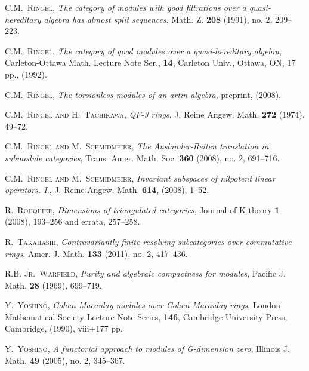 \documentclass[oneside, a4paper,reqno]{amsart}
\numberwithin{equation}{section}
\theoremstyle{definition}
\begin{document}
\begin{thebibliography}{99}
\textsc{C.M.~Ringel}, \textit{The category of modules with good
filtrations over a quasi-hereditary algebra has almost split
sequences},   Math. Z. {\bf 208} (1991),  no. 2, 209--223.

\textsc{C.M.~Ringel}, \textit{The category of good modules over a quasi-hereditary
algebra}, Carleton-Ottawa Math. Lecture Note Ser., {\bf 14},
Carleton Univ., Ottawa, ON, 17 pp., (1992).

\textsc{C.M.~Ringel}, \textit{The torsionless modules of an artin algebra},
preprint, (2008).

\textsc{C.M.~Ringel and H.~Tachikawa}, \textit{QF-3 rings}, J. Reine Angew.
Math.  {\bf 272}  (1974), 49--72.

\textsc{C.M.~Ringel and M.~Schmidmeier}, \textit{The Auslander-Reiten
translation in submodule categories}, Trans. Amer. Math. Soc. {\bf
360} (2008), no. 2, 691--716.

\textsc{C.M.~Ringel and M.~Schmidmeier}, \textit{Invariant subspaces of nilpotent linear
operators. I.}, J. Reine Angew. Math. {\bf 614}, (2008), 1--52.

\textsc{R.~Rouquier}, \textit{Dimensions of triangulated categories},
Journal of K-theory {\bf 1} (2008), 193--256 and errata, 257--258.

\textsc{R.~Takahashi}, \textit{Contravariantly finite resolving
subcategories over commutative rings},  Amer. J. Math. {\bf 133} (2011), no. 2, 417--436.

\textsc{R.B. Jr.~Warfield}, \textit{Purity and algebraic compactness
for modules},  Pacific J. Math. {\bf 28} (1969), 699--719.

\textsc{Y.~Yoshino}, \textit{Cohen-Macaulay modules over Cohen-Macaulay
rings},  London Mathematical Society Lecture Note Series, {\bf 146},
Cambridge University Press, Cambridge, (1990), viii+177 pp.

\textsc{Y.~Yoshino}, \textit{A functorial approach to modules of G-dimension zero},
Illinois J. Math.  {\bf 49}  (2005),  no. 2, 345--367.

\end{thebibliography}
\end{document}
